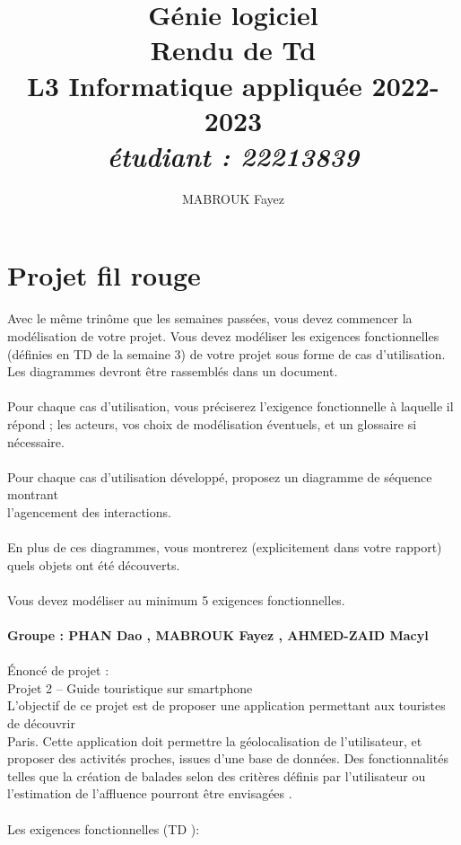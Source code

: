 \documentclass[12pt]{article}
\date{}
\author{MABROUK Fayez}
\title{{\bf  Génie logiciel} \\
	Rendu de Td \no 9  \\
	{\small L3 Informatique appliquée 2022-2023} \\
	{\it \small \no étudiant : 22213839}}
\begin{document}
	\maketitle
	\newpage
	\section{Projet fil rouge}
	Avec le même trinôme que les semaines passées, vous devez commencer la modélisation de votre
	projet. Vous devez modéliser les exigences fonctionnelles (définies en TD de la semaine 3) de votre
	projet sous forme de cas d’utilisation. Les diagrammes devront être rassemblés dans un document.\\
	\\
	Pour chaque cas d’utilisation, vous préciserez l’exigence fonctionnelle à laquelle il répond ; les
	acteurs, vos choix de modélisation éventuels, et un glossaire si nécessaire.\\
	\\
	Pour chaque cas d’utilisation développé, proposez un diagramme de séquence montrant\\
	l’agencement des interactions.\\
	\\
	En plus de ces diagrammes, vous montrerez (explicitement dans votre rapport) quels objets ont été
	découverts.\\
	\\
	Vous devez modéliser au minimum 5 exigences fonctionnelles.
	\\
	\\
	\textbf{Groupe : PHAN Dao , MABROUK Fayez , AHMED-ZAID Macyl}
	 \\
	 \\
	Énoncé de projet : \\
	Projet 2 – Guide touristique sur smartphone \\
	L’objectif de ce projet est de proposer une application permettant aux touristes de découvrir\\
	Paris. Cette application doit permettre la géolocalisation de l’utilisateur, et proposer des
	activités proches, issues d’une base de données. Des fonctionnalités telles que la création de
	balades selon des critères définis par l’utilisateur ou l’estimation de l’affluence pourront être
	envisagées .\\
	\\
	Les exigences fonctionnelles (TD ):\\
\end{document}
